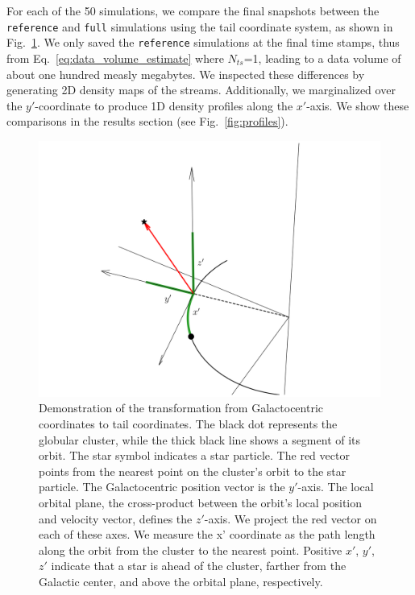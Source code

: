         For each of the 50 simulations, we compare the final snapshots between the \texttt{reference} and \texttt{full} simulations using the tail coordinate system, as shown in Fig.~\ref{fig:TailCoordinates}. We only saved the \texttt{reference} simulations at the final time stamps, thus from Eq.~\ref{eq:data_volume_estimate} where $N_{ts}$=1, leading to a data volume of about one hundred measly megabytes. We inspected these differences by generating 2D density maps of the streams. Additionally, we marginalized over the $y'$-coordinate to produce 1D density profiles along the $x'$-axis. We show these comparisons in the results section (see Fig.~\ref{fig:profiles}).
        \begin{figure}
            \centering
            \includegraphics[width=\linewidth]{images/tailcoordinates.png}
            \caption[Transform from Galactocentric coordinates to tail coordinates]{Demonstration of the transformation from Galactocentric coordinates to tail coordinates. The black dot represents the globular cluster, while the thick black line shows a segment of its orbit. The star symbol indicates a star particle. The red vector points from the nearest point on the cluster's orbit to the star particle. The Galactocentric position vector is the $y'$-axis. The local orbital plane, the cross-product between the orbit's local position and velocity vector, defines the $z'$-axis. We project the red vector on each of these axes. We measure the x' coordinate as the path length along the orbit from the cluster to the nearest point. Positive $x'$, $y'$, $z'$ indicate that a star is ahead of the cluster, farther from the Galactic center, and above the orbital plane, respectively.}
            \label{fig:TailCoordinates}
        \end{figure}
  
